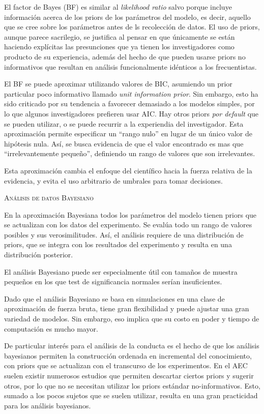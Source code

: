 \documentclass[a4paper,12pt]{article}
\begin{document}
El factor de Bayes (BF) es similar al {\slshape likelihood ratio} salvo porque incluye información acerca de los priors de los parámetros del modelo, es decir, aquello que se cree sobre los parámetros antes de ls recolección de datos. El uso de priors, aunque parece sacrilegio, se justifica al pensar en que únicamente se están haciendo explícitas las presunciones que ya tienen los investigadores como producto de su experiencia, además del hecho de que pueden usarse priors no informativos que resultan en análisis funcionalmente idénticos a los frecuentistas.

El BF se puede aproximar utilizando valores de BIC, asumiendo un prior particular poco informativo llamado {\slshape unit information prior}. Sin embargo, esto ha sido criticado por su tendencia a favorecer demasiado a los modelos simples, por lo que algunos investigadores prefieren usar AIC. Hay otros priors {\slshape por default} que se pueden utilizar, o se puede recurrir a la experiendia del investigador. Esta aproximación permite especificar un ``rango nulo'' en lugar de un único valor de hipótesis nula. Así, se busca evidencia de que el valor encontrado es mas que ``irrelevantemente pequeño'', definiendo un rango de valores que son irrelevantes.

Esta aproximación cambia el enfoque del científico hacia la fuerza relativa de la evidencia, y evita el uso arbitrario de umbrales para tomar decisiones.

{\scshape Análisis de datos Bayesiano}

En la aproximación Bayesiana todos los parámetros del modelo tienen priors que se actualizan con los datos del experimento. Se evalúa todo un rango de valores posibles y sus verosimilitudes. Así, el análisis requiere de una distribución de priors, que se integra con los resultados del experimento y resulta en una distribución posterior.

El análisis Bayesiano puede ser especialmente útil con tamaños de muestra pequeños en los que test de significancia normales serían insuficientes. 

Dado que el análisis Bayesiano se basa en simulaciones en una clase de aproximación de fuerza bruta, tiene gran flexibilidad y puede ajustar una gran variedad de modelos. Sin embargo, eso implica que su costo en poder y tiempo de computación es mucho mayor.

De particular interés para el análisis de la conducta es el hecho de que los análisis bayesianos permiten la construcción ordenada en incremental del conocimiento, con priors que se actualizan con el transcurso de los experimentos. En el AEC suelen existir numerosos estudios que permiten descartar ciertos priors y sugerir otros, por lo que no se necesitan utilizar los priors estándar no-informativos. Esto, sumado a los pocos sujetos que se suelen utilizar, resulta en una gran practicidad para los análisis bayesianos. 
\end{document}
